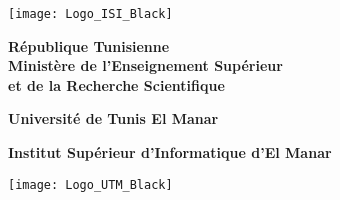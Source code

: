 


\thispagestyle{cover}%
\begin{minipage}[l]{0.2\columnwidth}
\vspace{6mm}
\hspace{+25mm}

\texttt{[image: Logo\_ISI\_Black]}\\
\end{minipage}
\hfill
\begin{minipage}[l]{0.6\columnwidth}
\centering
\footnotesize
\hspace{-5mm}
\textbf{{République Tunisienne}}\\
\vspace{1.5mm}
\hspace{-5mm}
\textbf{{Ministère de l'Enseignement Supérieur\\
et de la Recherche Scientifique}}\\
\hspace{-5mm}

\textbf{{Université de Tunis El Manar}}\\
\hspace{-5mm}

\textbf{{Institut Supérieur d'Informatique d’El Manar}}
\end{minipage}
\hfill
\begin{minipage}[l]{0.02\columnwidth}
\end{minipage}
\hfill
\begin{minipage}[l]{0.18\columnwidth}
\vspace{6mm}
\hspace{+15mm}

\texttt{[image: Logo\_UTM\_Black]}\\
\end{minipage}
\vskip1.5cm

